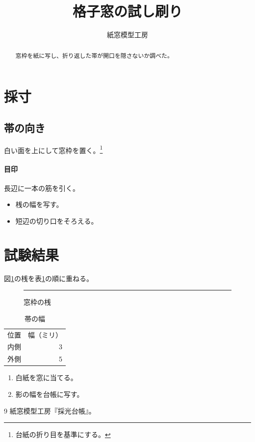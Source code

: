 \documentclass{ltjarticle}
\title{格子窓の試し刷り}
\author{紙窓模型工房}
\date{}
\begin{document}
\maketitle
\begin{abstract}
窓枠を紙に写し、折り返した帯が開口を隠さないか調べた。
\end{abstract}
\tableofcontents
\section{採寸}
\subsection{帯の向き}
白い面を上にして窓枠を置く。\footnote{台紙の折り目を基準にする。}
\paragraph{目印}
長辺に一本の筋を引く。
\begin{itemize}\item 桟の幅を写す。\item 短辺の切り口をそろえる。\end{itemize}
\newpage
\section{試験結果}
図\ref{fig:bar}の桟を表\ref{tab:width}の順に重ねる。
\begin{figure}[htbp]
\centering\rule{30mm}{3mm}
\caption{窓枠の桟}\label{fig:bar}
\end{figure}
\begin{table}[htbp]
\centering\caption{帯の幅}\label{tab:width}
\begin{tabular}{lr}位置 & 幅（ミリ）\\内側 & 3\\外側 & 5\end{tabular}
\end{table}
\begin{enumerate}\item 白紙を窓に当てる。\item 影の幅を台帳に写す\cite{ledger}。\end{enumerate}
\begin{thebibliography}{9}
 紙窓模型工房『採光台帳』。
\end{thebibliography}
\end{document}
